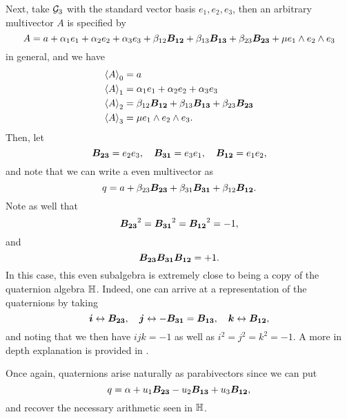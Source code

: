 \begin{example}
\label{ex:quaternions}
Next, take $\G_3$ with the standard vector basis $e_1,e_2,e_3$, then an arbitrary multivector $A$ is specified by
\begin{equation}
A= a + \alpha_1 e_1 + \alpha_2 e_2 + \alpha_3 e_3 + \beta_{12} \blade{B_{12}} + \beta_{13} \blade{B_{13}} + \beta_{23} \blade{B_{23}} + \mu e_1 \wedge e_2 \wedge e_3
\end{equation}
in general, and we have
\begin{subequations}
\begin{align}
\proj{0}{A}&=a\\
\proj{1}{A}&=\alpha_1 e_1 + \alpha_2 e_2 + \alpha_3 e_3\\
\proj{2}{A}&=\beta_{12} \blade{B_{12}} + \beta_{13} \blade{B_{13}} + \beta_{23} \blade{B_{23}}\\
\proj{3}{A}&= \mu e_1 \wedge e_2 \wedge e_3.
\end{align}
\end{subequations}
Then, let
\begin{equation}
\blade{B_{23}} = e_2 e_3, \quad \blade{B_{31}} = e_3 e_1, \quad \blade{B_{12}} = e_1 e_2,
\end{equation}
and note that we can write a even multivector as
\begin{equation}
q = a + \beta_{23}\blade{B_{23}} + \beta_{31} \blade{B_{31}} + \beta_{12} \blade{B_{12}}.
\end{equation}
Note as well that
\begin{equation}
\blade{B_{23}}^2 = \blade{B_{31}}^2 = \blade{B_{12}}^2 = -1,
\end{equation}
and
\begin{equation}
\blade{B_{23}}\blade{B_{31}}\blade{B_{12}} = +1.
\end{equation}
In this case, this even subalgebra is extremely close to being a copy of the quaternion algebra $\quat$. Indeed, one can arrive at a representation of the quaternions by taking
\begin{equation}
\boldsymbol{i} \leftrightarrow \blade{B_{23}}, \quad \boldsymbol{j} \leftrightarrow -\blade{B_{31}}=\blade{B_{13}}, \quad \boldsymbol{k} \leftrightarrow \blade{B_{12}},
\end{equation}
and noting that we then have $ijk=-1$ as well as $i^2=j^2=k^2=-1$. A more in depth explanation is provided in \cite{doran_geometric_2003}.

Once again, quaternions arise naturally as parabivectors since we can put
\begin{equation}
q= \alpha + u_1 \blade{B_{23}} - u_2 \blade{B_{13}} + u_3 \blade{B_{12}},
\end{equation}
and recover the necessary arithmetic seen in $\quat$.
\end{example}

